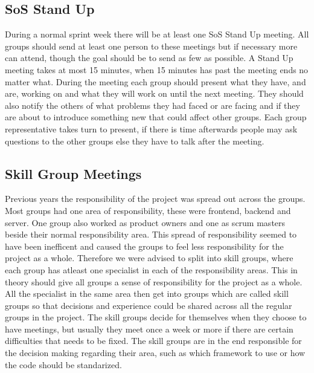 \subsection{SoS Stand Up}
During a normal sprint week there will be at least one SoS Stand Up meeting.
All groups should send at least one person to these meetings but if necessary more can attend, though the goal should be to send as few as possible.
A Stand Up meeting takes at most 15 minutes, when 15 minutes has past the meeting ends no matter what.
\newline
\newline
During the meeting each group should present what they have, and are, working on and what they will work on until the next meeting.
They should also notify the others of what problems they had faced or are facing and if they are about to introduce something new that could affect other groups.
Each group representative takes turn to present, if there is time afterwards people may ask questions to the other groups else they have to talk after the meeting.


\subsection{Skill Group Meetings}
Previous years the responsibility of the project was spread out across the groups.
Most groups had one area of responsibility, these were frontend, backend and server.
One group also worked as product owners and one as scrum masters beside their normal responsibility area.
This spread of responsibility seemed to have been inefficent and caused the groups to feel less responsibility for the project as a whole.
\newline
\newline
Therefore we were advised to split into skill groups, where each group has atleast one specialist in each of the responsibility areas.
This in theory should give all groups a sense of responsibility for the project as a whole.
\newline
\newline
All the specialist in the same area then get into groups which are called skill groups so that decisions and experience could be shared across all the regular groups in the project.
The skill groups decide for themselves when they choose to have meetings, but usually they meet once a week or more if there are certain difficulties that needs to be fixed.
The skill groups are in the end responsible for the decision making regarding their area, such as which framework to use or how the code should be standarized.

